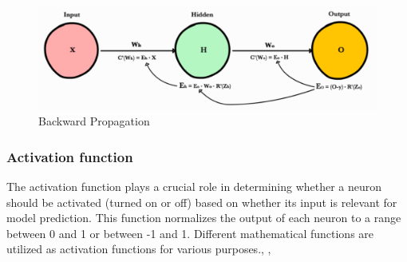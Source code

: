 \begin{figure}[H]
    \centering
    \includegraphics[width=0.8\linewidth]{tex/img/backward_propagation.PNG}
    \caption{Backward Propagation \cite{ajitjaokar}}
    \label{fig:backward_propagation}
\end{figure}
\subsubsection{Activation function}
The activation function plays a crucial role in determining whether a neuron should be activated (turned on or off) based on whether its input is relevant for model prediction. This function normalizes the output of each neuron to a range between 0 and 1 or between -1 and 1. Different mathematical functions are utilized as activation functions for various purposes.\cite{sharma2017activation}, \cite{apicella2021survey}, \cite{bfortuner_mlglossary}

